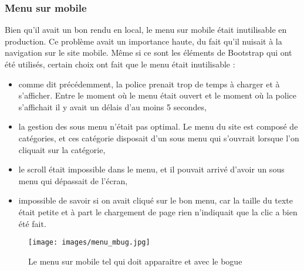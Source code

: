 \documentclass[12pt,a4paper]{article}
\begin{document}
\subsubsection{Menu sur mobile}
Bien qu'il avait un bon rendu en local, le menu sur mobile était inutilisable en production. Ce problème avait un importance haute, du fait qu'il nuisait à la navigation sur le site mobile. Même si ce sont les éléments de Bootstrap qui ont été utilisés, certain choix ont fait que le menu était inutilisable : 
\begin{itemize}
\item comme dit précédemment, la police prenait trop de temps à charger et à s'afficher. Entre le moment où le menu était ouvert et le moment où la police s'affichait il y avait un délais d'au moins 5 secondes,
\item la gestion des sous menu n'était pas optimal. Le menu du site est composé de catégories, et ces catégorie disposait d'un sous menu qui s'ouvrait lorsque l'on cliquait sur la catégorie,
\item le scroll était impossible dans le menu, et il pouvait arrivé d'avoir un sous menu qui dépassait de l'écran,
\item impossible de savoir si on avait cliqué sur le bon menu, car la taille du texte était petite et à part le chargement de page rien n'indiquait que la clic a bien été fait.
\end{itemize}\par 

\begin{figure}[h!]
\centering\texttt{[image: images/menu\_mbug.jpg]} 
\caption{Le menu sur mobile tel qui doit apparaitre et avec le bogue}
\end{figure}
\end{document}
